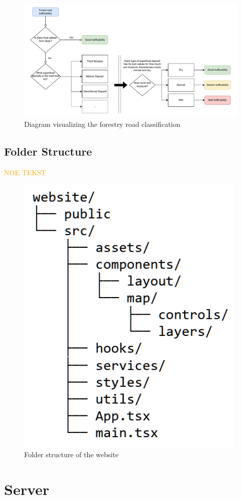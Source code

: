 \begin{figure}[h]
    \centering
    \centerline{\includegraphics[width=1.2\linewidth]{figures/roadclassification.pdf}}
    \caption{Diagram visualizing the forestry road classification}
    \label{fig:forestryroadclassification}
\end{figure}

\subsection{Folder Structure}

\textcolor{orange}{NOE TEKST}
\begin{figure}[h]
    \centering
    \includegraphics[width=0.5\linewidth]{figures/website_folder_structure.pdf}
    \caption{Folder structure of the website}
    \label{fig:website_folder_structure}
\end{figure}

\section{Server}

